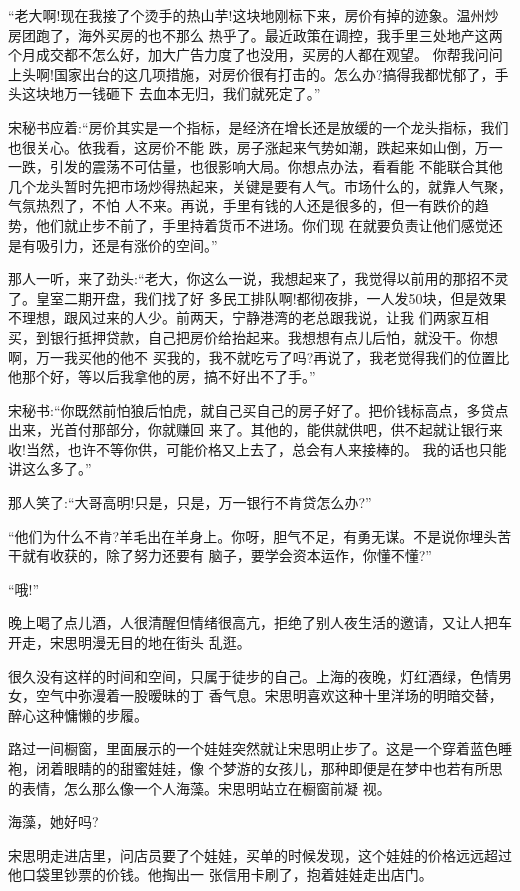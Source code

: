 \documentclass[11pt,a4paper,onecolumn]{article}
\begin{document}
``老大啊!现在我接了个烫手的热山芋!这块地刚标下来，房价有掉的迹象。温州炒房团跑了，海外买房的也不那么
热乎了。最近政策在调控，我手里三处地产这两个月成交都不怎么好，加大广告力度了也没用，买房的人都在观望。
你帮我问问上头啊!国家出台的这几项措施，对房价很有打击的。怎么办?搞得我都忧郁了，手头这块地万一钱砸下
去血本无归，我们就死定了。''

宋秘书应着:``房价其实是一个指标，是经济在增长还是放缓的一个龙头指标，我们也很关心。依我看，这房价不能
跌，房子涨起来气势如潮，跌起来如山倒，万一一跌，引发的震荡不可估量，也很影响大局。你想点办法，看看能
不能联合其他几个龙头暂时先把市场炒得热起来，关键是要有人气。市场什么的，就靠人气聚，气氛热烈了，不怕
人不来。再说，手里有钱的人还是很多的，但一有跌价的趋势，他们就止步不前了，手里持着货币不进场。你们现
在就要负责让他们感觉还是有吸引力，还是有涨价的空间。''

那人一听，来了劲头:``老大，你这么一说，我想起来了，我觉得以前用的那招不灵了。皇室二期开盘，我们找了好
多民工排队啊!都彻夜排，一人发50块，但是效果不理想，跟风过来的人少。前两天，宁静港湾的老总跟我说，让我
们两家互相买，到银行抵押贷款，自己把房价给抬起来。我想想有点儿后怕，就没干。你想啊，万一我买他的他不
买我的，我不就吃亏了吗?再说了，我老觉得我们的位置比他那个好，等以后我拿他的房，搞不好出不了手。''

宋秘书:``你既然前怕狼后怕虎，就自己买自己的房子好了。把价钱标高点，多贷点出来，光首付那部分，你就赚回
来了。其他的，能供就供吧，供不起就让银行来收!当然，也许不等你供，可能价格又上去了，总会有人来接棒的。
我的话也只能讲这么多了。''

那人笑了:``大哥高明!只是，只是，万一银行不肯贷怎么办?''

``他们为什么不肯?羊毛出在羊身上。你呀，胆气不足，有勇无谋。不是说你埋头苦干就有收获的，除了努力还要有
脑子，要学会资本运作，你懂不懂?''

``哦!''

晚上喝了点儿酒，人很清醒但情绪很高亢，拒绝了别人夜生活的邀请，又让人把车开走，宋思明漫无目的地在街头
乱逛。

很久没有这样的时间和空间，只属于徒步的自己。上海的夜晚，灯红酒绿，色情男女，空气中弥漫着一股暧昧的丁
香气息。宋思明喜欢这种十里洋场的明暗交替，醉心这种慵懒的步履。

路过一间橱窗，里面展示的一个娃娃突然就让宋思明止步了。这是一个穿着蓝色睡袍，闭着眼睛的的甜蜜娃娃，像
个梦游的女孩儿，那种即便是在梦中也若有所思的表情，怎么那么像一个人\myrule 海藻。宋思明站立在橱窗前凝
视。

海藻，她好吗?

宋思明走进店里，问店员要了个娃娃，买单的时候发现，这个娃娃的价格远远超过他口袋里钞票的价钱。他掏出一
张信用卡刷了，抱着娃娃走出店门。
\end{document}
